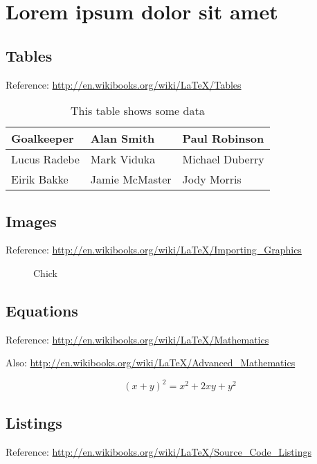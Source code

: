 \chapter{Lorem ipsum dolor sit amet}\label{chp:LABEL_CHP_2}

\section{Tables}\label{sec:LABEL_CHP_2_SEC_A}
Reference: \url{http://en.wikibooks.org/wiki/LaTeX/Tables}

\begin{table}[!h]
  \centering
  \begin{tabular}{ |l|l|l| }
    \hline
      Goalkeeper & Alan Smith & Paul Robinson \\
    \hline
      Lucus Radebe &  Mark Viduka & Michael Duberry \\
    \hline
      Eirik Bakke & Jamie McMaster & Jody Morris \\
    \hline
  \end{tabular}
  \caption{This table shows some data}
  \label{tab:LABEL_TAB_1}
\end{table}

\section{Images}\label{sec:LABEL_CHP_2_SEC_B}
Reference: \url{http://en.wikibooks.org/wiki/LaTeX/Importing_Graphics}

\begin{figure}
  \centering
  \caption{Chick}
  \label{fig:LABEL_FIG_1}
\end{figure}

\section{Equations}\label{sec:LABEL_CHP_2_SEC_C}
Reference: \url{http://en.wikibooks.org/wiki/LaTeX/Mathematics}

Also: \url{http://en.wikibooks.org/wiki/LaTeX/Advanced_Mathematics}

\begin{equation}
  (x + y)^2 = x^2 + 2xy + y^2
  \label{eq:LABEL_EQ_1}
\end{equation}

\section{Listings}\label{sec:LABEL_CHP_2_SEC_D}
Reference: \url{http://en.wikibooks.org/wiki/LaTeX/Source_Code_Listings}

